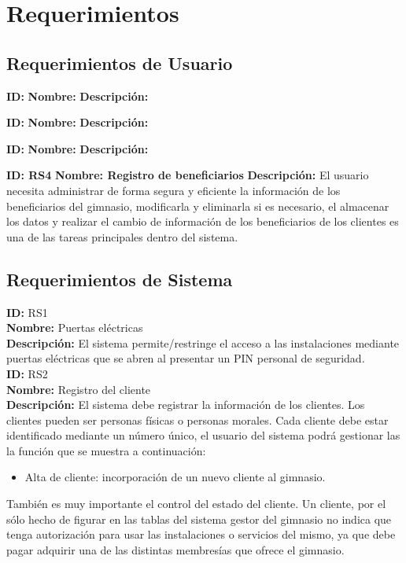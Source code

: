 \chapter*{Requerimientos}\label{cap.requerimientos}


\section{Requerimientos de Usuario}

\textbf{ID: }
\textbf{Nombre: }
\textbf{Descripci\'on: }

\textbf{ID: }
\textbf{Nombre: }
\textbf{Descripci\'on: }

\textbf{ID: }
\textbf{Nombre: }
\textbf{Descripci\'on: }

\textbf{ID: RS4}
\textbf{Nombre: Registro de beneficiarios }
\textbf{Descripci\'on: } El usuario necesita administrar de forma segura y eficiente la información de los beneficiarios del gimnasio, modificarla y eliminarla si es necesario, el almacenar los datos y realizar el cambio de información de los beneficiarios de los clientes es una de las tareas principales dentro del sistema.\\

\section{Requerimientos de Sistema}
\textbf{ID: } RS1 \\
\textbf{Nombre:} Puertas eléctricas \\
\textbf{Descripción:} El sistema permite/restringe el acceso a las instalaciones mediante puertas eléctricas que se abren al presentar un PIN personal de seguridad.\\

\textbf{ID: } RS2\\
\textbf{Nombre: }Registro del cliente\\
\textbf{Descripción:} El sistema debe registrar la información de los clientes. Los clientes pueden ser personas físicas o personas morales. Cada cliente debe estar identificado mediante un número único, el usuario del sistema podrá gestionar las la función que se muestra a continuación:\\
	\begin{itemize} 
		\item Alta de cliente: incorporación de un nuevo cliente al gimnasio.
	\end{itemize}
También es muy importante el control del estado del cliente. Un cliente, por el sólo hecho de figurar en las tablas del sistema gestor del gimnasio no indica que tenga autorización para usar las instalaciones o servicios del mismo, ya que debe pagar adquirir una de las distintas membresías que ofrece el gimnasio.\\



